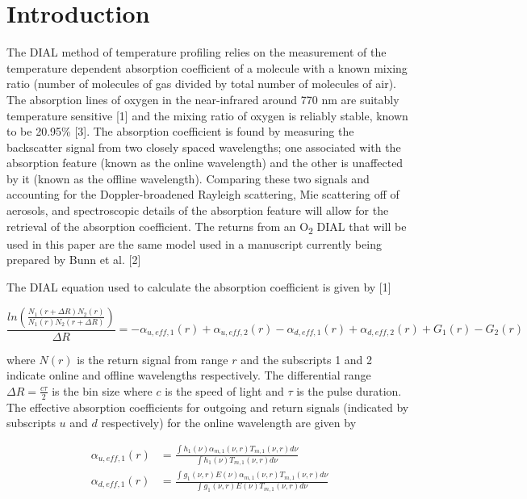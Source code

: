 \documentclass[twoside]{article}
\begin{document}
\section{Introduction}
The DIAL method of temperature profiling relies on the measurement of the temperature dependent absorption coefficient of a molecule with a known mixing ratio (number of molecules of gas divided by total number of molecules of air). 
The absorption lines of oxygen in the near-infrared around 770 nm are suitably temperature sensitive [1] and the mixing ratio of oxygen is reliably stable, known to be 20.95\% [3]. 
The absorption coefficient is found by measuring the backscatter signal from two closely spaced wavelengths; one associated with the absorption feature (known as the online wavelength) and the other is unaffected by it (known as the offline wavelength). 
Comparing these two signals and accounting for the Doppler-broadened Rayleigh scattering, Mie scattering off of aerosols, and spectroscopic details of the absorption feature will allow for the retrieval of the absorption coefficient. 
The returns from an O\textsubscript{2} DIAL that will be used in this paper are the same model used in a manuscript currently being prepared by Bunn et al. [2]\\
\par
\noindent The DIAL equation used to calculate the absorption coefficient is given by [1]

\begin{equation}
	\frac{ln\left(\frac{N_1(r+\Delta R) N_2(r)}{N_1(r) N_2(r+\Delta R)}\right)}{\Delta R} = -\alpha_{u,eff,1}(r) + \alpha_{u,eff,2}(r) -\alpha_{d,eff,1}(r) +\alpha_{d,eff,2}(r) + G_1(r) - G_2(r)
\end{equation}

\noindent where $N(r)$ is the return signal from range $r$ and the subscripts 1 and 2 indicate online and offline wavelengths respectively. 
The differential range $\Delta R = \frac{c \tau}{2}$ is the bin size where $c$ is the speed of light and $\tau$ is the pulse duration. 
The effective absorption coefficients for outgoing and return signals (indicated by subscripts $u$ and $d$ respectively) for the online wavelength are given by

\begin{align}
	\alpha_{u,eff,1}(r) &= \frac{\int h_1(\nu) \alpha_{m,1}(\nu,r) T_{m,1}(\nu,r) d\nu}{\int h_1(\nu) T_{m,1}(\nu,r) d\nu}\\
	\alpha_{d,eff,1}(r) &= \frac{\int g_1(\nu,r) E(\nu) \alpha_{m,1}(\nu,r) T_{m,1}(\nu,r) d\nu}{\int g_1(\nu,r) E(\nu) T_{m,1}(\nu,r) d\nu}
\end{align}
\end{document}
